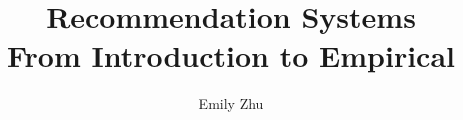 \documentclass[graybox,envcountchap,sectrefs]{svmono}
\begin{document}
\author{Emily Zhu}
\title{Recommendation Systems\\  From Introduction to Empirical}
\subtitle{}
\maketitle

\frontmatter%

%
%
%
%

\tableofcontents




\mainmatter%
%
  
 
 
 
 
 
 
% 

%

\backmatter%

%
\printindex

\end{document}
